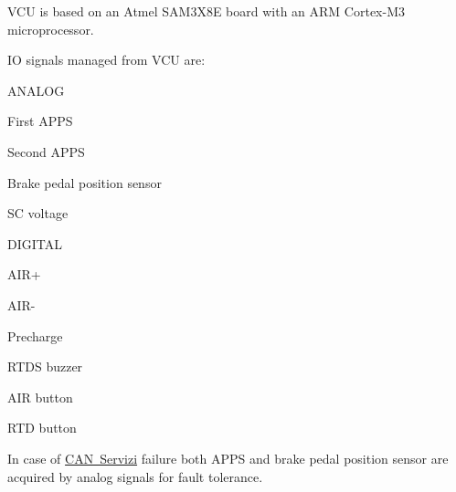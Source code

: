 V\+CU is based on an Atmel S\+A\+M3\+X8E board with an A\+RM Cortex-\/\+M3 microprocessor.

IO signals managed from V\+CU are\+:
\begin{DoxyItemize}
\item A\+N\+A\+L\+OG
\begin{DoxyEnumerate}
\item First A\+P\+PS
\item Second A\+P\+PS
\item Brake pedal position sensor
\item SC voltage
\end{DoxyEnumerate}
\item D\+I\+G\+I\+T\+AL
\begin{DoxyEnumerate}
\item A\+I\+R+
\item A\+I\+R-\/
\item Precharge
\item R\+T\+DS buzzer
\item A\+IR button
\item R\+TD button
\end{DoxyEnumerate}
\end{DoxyItemize}

In case of \mbox{\hyperlink{CAN_servizi_page}{C\+AN Servizi}} failure both A\+P\+PS and brake pedal position sensor are acquired by analog signals for fault tolerance. 